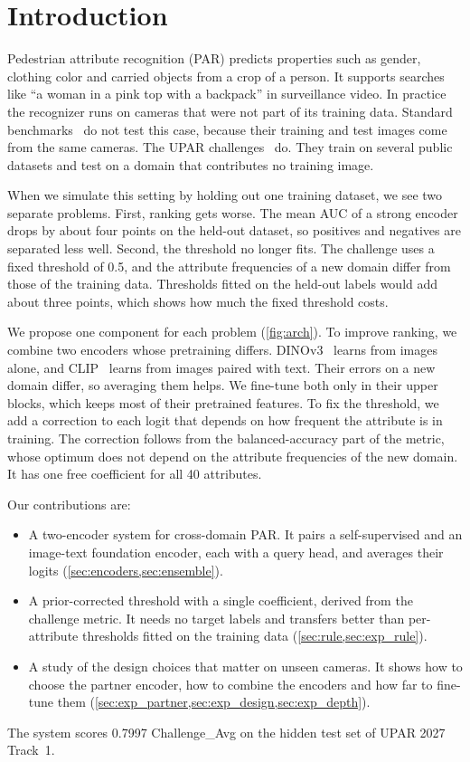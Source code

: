 \documentclass[10pt,twocolumn,letterpaper]{article}
\begin{document}
\section{Introduction}
\label{sec:intro}

Pedestrian attribute recognition (PAR) predicts properties such as gender, clothing color and carried objects from a crop of a person. It supports searches like ``a woman in a pink top with a backpack'' in surveillance video. In practice the recognizer runs on cameras that were not part of its training data. Standard benchmarks~\cite{peta,pa100k,market} do not test this case, because their training and test images come from the same cameras. The UPAR challenges~\cite{upar,upar23,upar24} do. They train on several public datasets and test on a domain that contributes no training image.

When we simulate this setting by holding out one training dataset, we see two separate problems. First, ranking gets worse. The mean AUC of a strong encoder drops by about four points on the held-out dataset, so positives and negatives are separated less well. Second, the threshold no longer fits. The challenge uses a fixed threshold of 0.5, and the attribute frequencies of a new domain differ from those of the training data. Thresholds fitted on the held-out labels would add about three points, which shows how much the fixed threshold costs.

We propose one component for each problem (\cref{fig:arch}). To improve ranking, we combine two encoders whose pretraining differs. DINOv3~\cite{dinov3} learns from images alone, and CLIP~\cite{clip} learns from images paired with text. Their errors on a new domain differ, so averaging them helps. We fine-tune both only in their upper blocks, which keeps most of their pretrained features. To fix the threshold, we add a correction to each logit that depends on how frequent the attribute is in training. The correction follows from the balanced-accuracy part of the metric, whose optimum does not depend on the attribute frequencies of the new domain. It has one free coefficient for all 40 attributes.

Our contributions are:
\begin{itemize}
\item A two-encoder system for cross-domain PAR. It pairs a self-supervised and an image-text foundation encoder, each with a query head, and averages their logits (\cref{sec:encoders,sec:ensemble}).
\item A prior-corrected threshold with a single coefficient, derived from the challenge metric. It needs no target labels and transfers better than per-attribute thresholds fitted on the training data (\cref{sec:rule,sec:exp_rule}).
\item A study of the design choices that matter on unseen cameras. It shows how to choose the partner encoder, how to combine the encoders and how far to fine-tune them (\cref{sec:exp_partner,sec:exp_design,sec:exp_depth}).
\end{itemize}
The system scores 0.7997 Challenge\_Avg on the hidden test set of UPAR 2027 Track~1.
\end{document}
